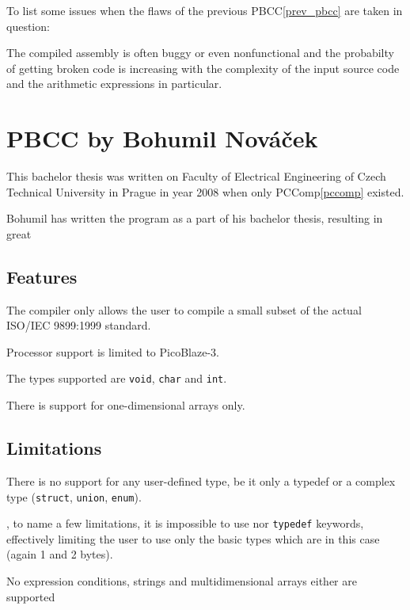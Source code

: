        To list some issues when the flaws of the previous PBCC\ref{prev_pbcc} are taken in question:

        The compiled assembly is often buggy or even nonfunctional and the probabilty of getting broken code is increasing with the complexity of the input source code and the arithmetic expressions in particular.

    \section{PBCC by Bohumil Nováček}\label{not_quite_c}

    This bachelor thesis was written on Faculty of Electrical Engineering of Czech Technical University in Prague in year 2008 when only PCComp\ref{pccomp} existed.

    Bohumil has written the program as a part of his bachelor thesis, resulting in great 

        \subsection{Features}

        The compiler only allows the user to compile a small subset of the actual ISO/IEC 9899:1999 standard.

        Processor support is limited to PicoBlaze-3.

        The types supported are \texttt{void}, \texttt{char} and \texttt{int}.

        There is support for one-dimensional arrays only.

        \subsection{Limitations}

        There is no support for any user-defined type, be it only a typedef or a complex type (\texttt{struct}, \texttt{union}, \texttt{enum}).

    ,
    to name a few limitations, it is impossible to use nor \texttt{typedef} keywords, effectively limiting the user to use only the basic types which are in this case  (again 1 and 2 bytes).

    No expression conditions, strings and multidimensional arrays either are supported


